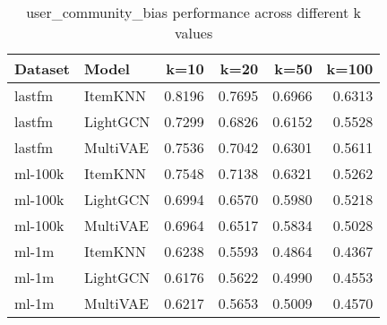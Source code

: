 \begin{table}[htbp]
\centering
\caption{user_community_bias performance across different k values}
\begin{tabular}{llrrrr}
\toprule
Dataset & Model & k=10 & k=20 & k=50 & k=100 \\
\midrule
lastfm & ItemKNN & 0.8196 & 0.7695 & 0.6966 & 0.6313 \\
lastfm & LightGCN & 0.7299 & 0.6826 & 0.6152 & 0.5528 \\
lastfm & MultiVAE & 0.7536 & 0.7042 & 0.6301 & 0.5611 \\
ml-100k & ItemKNN & 0.7548 & 0.7138 & 0.6321 & 0.5262 \\
ml-100k & LightGCN & 0.6994 & 0.6570 & 0.5980 & 0.5218 \\
ml-100k & MultiVAE & 0.6964 & 0.6517 & 0.5834 & 0.5028 \\
ml-1m & ItemKNN & 0.6238 & 0.5593 & 0.4864 & 0.4367 \\
ml-1m & LightGCN & 0.6176 & 0.5622 & 0.4990 & 0.4553 \\
ml-1m & MultiVAE & 0.6217 & 0.5653 & 0.5009 & 0.4570 \\
\bottomrule
\end{tabular}
\end{table}